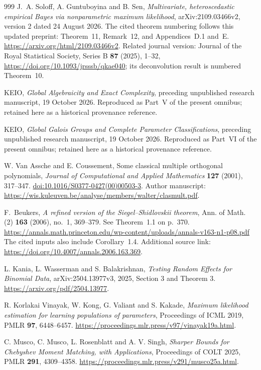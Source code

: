 \documentclass[11pt,a4paper]{article}
\theoremstyle{definition}
\theoremstyle{remark}
\numberwithin{equation}{section}
\begin{document}
\begin{thebibliography}{999}
J.~A. Soloff, A. Guntuboyina and B. Sen, \emph{Multivariate, heteroscedastic empirical Bayes via nonparametric maximum likelihood}, arXiv:2109.03466v2, version 2 dated 24 August 2026. The cited theorem numbering follows this updated preprint: Theorem~11, Remark~12, and Appendices~D.1 and~E. \url{https://arxiv.org/html/2109.03466v2}. Related journal version: Journal of the Royal Statistical Society, Series B \textbf{87} (2025), 1--32, \url{https://doi.org/10.1093/jrsssb/qkae040}; its deconvolution result is numbered Theorem~10.

KEIO, \emph{Global Algebraicity and Exact Complexity}, preceding
unpublished research manuscript, 19 October 2026.
Reproduced as Part~V of the present omnibus; retained here as a historical provenance reference.

KEIO, \emph{Global Galois Groups and Complete Parameter Classifications},
preceding unpublished research manuscript, 19 October 2026.
Reproduced as Part~VI of the present omnibus; retained here as a historical provenance reference.

W. Van Assche and E. Coussement, Some classical multiple orthogonal
polynomials, \emph{Journal of Computational and Applied Mathematics}
\textbf{127} (2001), 317--347.
\href{https://doi.org/10.1016/S0377-0427(00)00503-3}{doi:10.1016/S0377-0427(00)00503-3}.
Author manuscript: \url{https://wis.kuleuven.be/analyse/members/walter/clasmult.pdf}.

F.~Beukers,
\emph{A refined version of the Siegel--Shidlovskii theorem},
Ann. of Math. (2) \textbf{163} (2006), no.~1, 369--379.
See Theorem~1.1 on p.~370.
\url{https://annals.math.princeton.edu/wp-content/uploads/annals-v163-n1-p08.pdf}
The cited inputs also include Corollary~1.4.
Additional source link: \url{https://doi.org/10.4007/annals.2006.163.369}.

L. Kania, L. Wasserman and S. Balakrishnan,
\emph{Testing Random Effects for Binomial Data}, arXiv:2504.13977v3,
2025, Section 3 and Theorem 3.
\url{https://arxiv.org/pdf/2504.13977}.

R. Korlakai Vinayak, W. Kong, G. Valiant and S. Kakade,
\emph{Maximum likelihood estimation for learning populations of parameters},
Proceedings of ICML 2019, PMLR \textbf{97}, 6448--6457.
\url{https://proceedings.mlr.press/v97/vinayak19a.html}.

C. Musco, C. Musco, L. Rosenblatt and A. V. Singh,
\emph{Sharper Bounds for Chebyshev Moment Matching, with Applications},
Proceedings of COLT 2025, PMLR \textbf{291}, 4309--4358.
\url{https://proceedings.mlr.press/v291/musco25a.html}.


\end{thebibliography}
\end{document}
